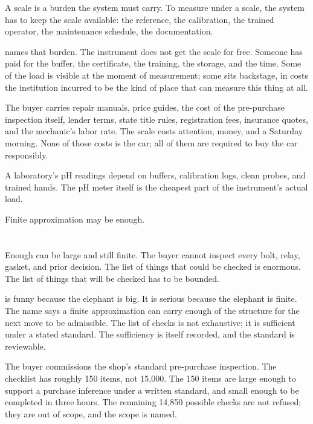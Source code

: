 A scale is a burden the system must carry. To measure under a scale,
the system has to keep the scale available: the reference, the
calibration, the trained operator, the maintenance schedule, the
documentation.

 names that burden. The instrument does not get the scale
for free. Someone has paid for the buffer, the certificate, the
training, the storage, and the time. Some of the load is visible at
the moment of measurement; some sits backstage, in costs the
institution incurred to be the kind of place that can measure this
thing at all.

The buyer carries repair manuals, price guides, the cost of the
pre-purchase inspection itself, lender terms, state title rules,
registration fees, insurance quotes, and the mechanic's labor rate.
The scale costs attention, money, and a Saturday morning. None of
those costs is the car; all of them are required to buy the car
responsibly.

A laboratory's pH readings depend on buffers, calibration logs, clean
probes, and trained hands. The pH meter itself is the cheapest part of
the instrument's actual load.

Finite approximation may be enough.

\section{}
\label{se:finite-elephant}

Enough can be large and still finite. The buyer cannot inspect every
bolt, relay, gasket, and prior decision. The list of things that could
be checked is enormous. The list of things that will be checked has to
be bounded.

 is funny because the elephant is big. It is
serious because the elephant is finite. The name says a finite
approximation can carry enough of the structure for the next move to be
admissible. The list of checks is not exhaustive; it is sufficient
under a stated standard. The sufficiency is itself recorded, and the
standard is reviewable.

The buyer commissions the shop's standard pre-purchase inspection. The
checklist has roughly 150 items, not 15{,}000. The 150 items are large
enough to support a purchase inference under a written standard, and
small enough to be completed in three hours. The remaining 14{,}850
possible checks are not refused; they are out of scope, and the scope
is named.

